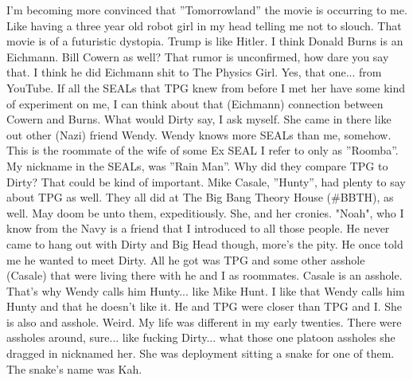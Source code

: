 \documentclass{article}
\begin{document}
\begin{multicols}{2}
I'm becoming more convinced that ''Tomorrowland'' the movie is occurring to me. Like having a three year old robot girl in my head telling me not to slouch. That movie is of a futuristic dystopia. Trump is like Hitler. I think Donald Burns is an Eichmann. Bill Cowern as well? That rumor is unconfirmed, how dare you say that. I think he did Eichmann shit to The Physics Girl. Yes, that one... from YouTube. If all the SEALs that TPG knew from before I met her have some kind of experiment on me, I can think about that (Eichmann) connection between Cowern and Burns. What would Dirty say, I ask myself. She came in there like out other (Nazi) friend Wendy. Wendy knows more SEALs than me, somehow. This is the roommate of the wife of some Ex SEAL I refer to only as ''Roomba''. My nickname in the SEALs, was ''Rain Man''. Why did they compare TPG to Dirty? That could be kind of important. Mike Casale, ''Hunty'', had plenty to say about TPG as well. They all did at The Big Bang Theory House (\#BBTH), as well. May doom be unto them, expeditiously. She, and her cronies. "Noah", who I know from the Navy is a friend that I introduced to all those people. He never came to hang out with Dirty and Big Head though, more's the pity. He once told me he wanted to meet Dirty. All he got was TPG and some other asshole (Casale) that were living there with he and I as roommates. Casale is an asshole. That's why Wendy calls him Hunty... like Mike Hunt. I like that Wendy calls him Hunty and that he doesn't like it. He and TPG were closer than TPG and I. She is also and asshole. Weird. My life was different in my early twenties. There were assholes around, sure... like fucking Dirty... what those one platoon assholes she dragged in nicknamed her. She was deployment sitting a snake for one of them. The snake's name was Kah.


\end{multicols}
\end{document}
